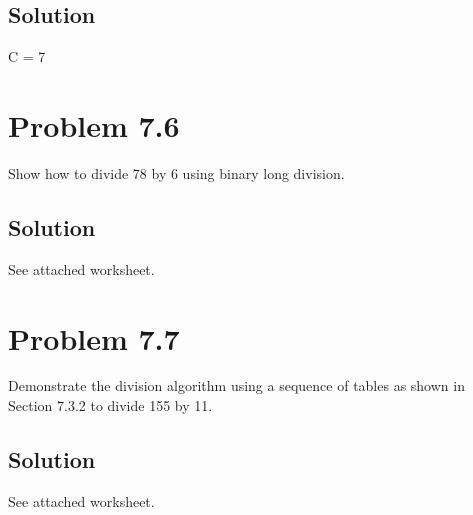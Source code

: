 \documentclass[letterpaper,11pt]{texMemo} %
\begin{document}
\subsection*{Solution}
C = 7

\section*{Problem 7.6}
Show how to divide 78 by 6 using binary long division.
\subsection*{Solution}
See attached worksheet.

\section*{Problem 7.7}
Demonstrate the division algorithm using a sequence of tables as shown in Section 7.3.2
to divide 155 by 11.
\subsection*{Solution}
See attached worksheet.
\end{document}
